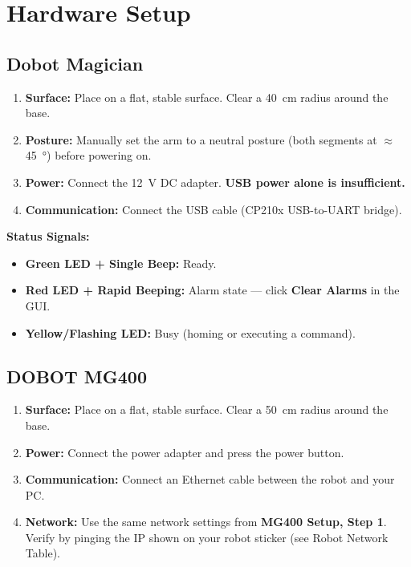 \documentclass[11pt,a4paper]{article}
\begin{document}
\section{Hardware Setup}

\subsection*{Dobot Magician}

\begin{enumerate}
  \item \textbf{Surface:} Place on a flat, stable surface. Clear a \qty{40}{\cm} radius around the base.
  \item \textbf{Posture:} Manually set the arm to a neutral posture (both segments at $\approx$\qty{45}{\degree}) before powering on.
  \item \textbf{Power:} Connect the \qty{12}{\V} DC adapter. \textbf{USB power alone is insufficient.}
  \item \textbf{Communication:} Connect the USB cable (CP210x USB-to-UART bridge).
\end{enumerate}

\textbf{Status Signals:}
\begin{itemize}
  \item \textbf{Green LED + Single Beep:} Ready.
  \item \textbf{Red LED + Rapid Beeping:} Alarm state — click \textbf{Clear Alarms} in the GUI.
  \item \textbf{Yellow/Flashing LED:} Busy (homing or executing a command).
\end{itemize}

\subsection*{DOBOT MG400}

\begin{enumerate}
  \item \textbf{Surface:} Place on a flat, stable surface. Clear a \qty{50}{\cm} radius around the base.
  \item \textbf{Power:} Connect the power adapter and press the power button.
  \item \textbf{Communication:} Connect an Ethernet cable between the robot and your PC.
  \item \textbf{Network:} Use the same network settings from \textbf{MG400 Setup, Step 1}.
        Verify by pinging the IP shown on your robot sticker (see Robot Network Table).
\end{enumerate}
\end{document}
